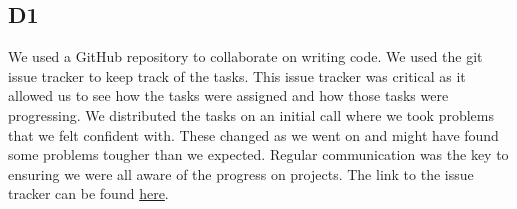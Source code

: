 \subsection{D1}
    We used a GitHub repository to collaborate on writing code. We used the git issue tracker to keep track of the tasks. This issue tracker was critical as it allowed us to see how the tasks were assigned and how those tasks were progressing. We distributed the tasks on an initial call where we took problems that we felt confident with. These changed as we went on and might have found some problems tougher than we expected. Regular communication was the key to ensuring we were all aware of the progress on projects. The link to the issue tracker can be found  \href{https://github.com/drlim2u/ELE2024-Control-Coursework/issues}{here}.